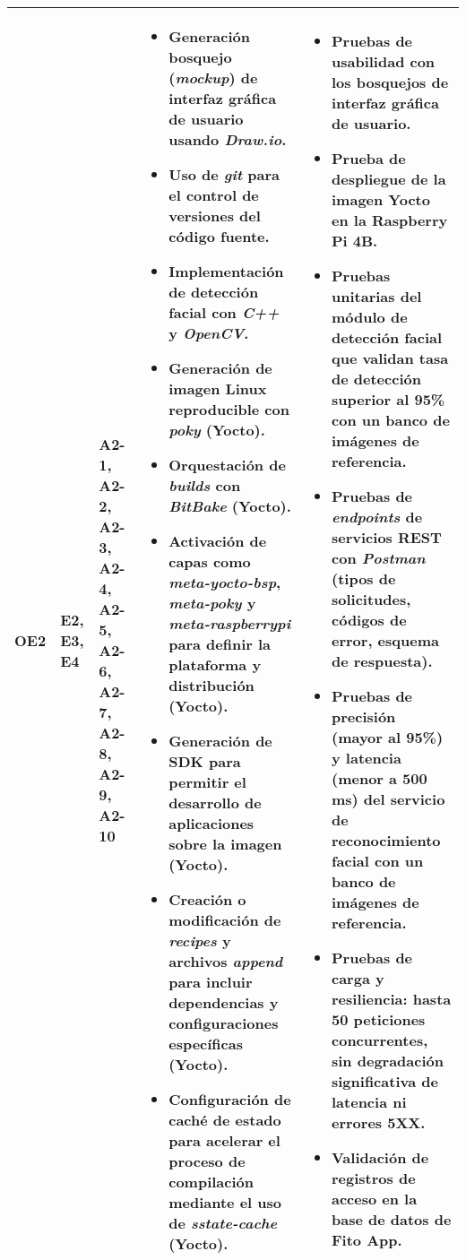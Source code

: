 \begin{landscape}
\begin{longtable}{l|l|p{2.5cm}|p{7cm}|p{7cm}}
        OE2 & E2, E3, E4 & A2-1, A2-2, A2-3, A2-4, A2-5, A2-6, A2-7, A2-8, A2-9, A2-10 & \vspace{-\baselineskip}
        \setlength{\leftmargini}{1em}
        \begin{itemize}
            \item Generación bosquejo (\textit{mockup}) de interfaz gráfica de usuario usando \textit{Draw.io}.
            \item Uso de \textit{git} para el control de versiones del código fuente. 
            \item Implementación de detección facial con \textit{C++} y \textit{OpenCV}.
            \item Generación de imagen Linux reproducible con \textit{poky} (Yocto).
            \item Orquestación de \textit{builds} con \textit{BitBake} (Yocto).
            \item Activación de capas como \textit{meta-yocto-bsp}, \textit{meta-poky} y \textit{meta-raspberrypi} para definir la plataforma y distribución (Yocto).
            \item Generación de SDK para permitir el desarrollo de aplicaciones sobre la imagen (Yocto).
            \item Creación o modificación de \textit{recipes} y archivos \textit{append} para incluir dependencias y configuraciones específicas (Yocto).
            \item Configuración de caché de estado para acelerar el proceso de compilación mediante el uso de \textit{sstate-cache} (Yocto).
        \end{itemize} & \vspace{-\baselineskip}
        \setlength{\leftmargini}{1em}
        \begin{itemize}
            \item Pruebas de usabilidad con los bosquejos de interfaz gráfica de usuario.
            \item Prueba de despliegue de la imagen Yocto en la Raspberry Pi 4B.
            \item Pruebas unitarias del módulo de detección facial que validan tasa de detección superior al 95\% con un banco de imágenes de referencia.
            \item Pruebas de \textit{endpoints} de servicios REST con \textit{Postman} (tipos de solicitudes, códigos de error, esquema de respuesta).
            \item Pruebas de precisión (mayor al 95\%) y latencia (menor a 500 ms) del servicio  de reconocimiento facial con un banco de imágenes de referencia.
            \item Pruebas de carga y resiliencia: hasta 50 peticiones concurrentes, sin degradación significativa de latencia ni errores 5XX.
            \item Validación de registros de acceso en la base de datos de Fito App.
        \end{itemize}\\
        \hline
        

\end{longtable}
\end{landscape}
